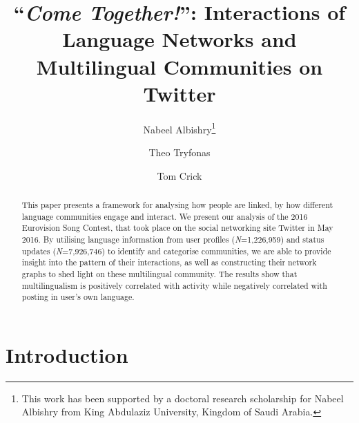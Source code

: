 \documentclass{llncs}
\begin{document}
\title{``{\emph{Come Together!}}'': Interactions of Language Networks and Multilingual Communities on Twitter}

\author{Nabeel Albishry\thanks{This work has been supported by a doctoral research scholarship for
Nabeel Albishry from King Abdulaziz University, Kingdom of Saudi
Arabia.} \and Theo Tryfonas \and Tom
  Crick}



\maketitle

\begin{abstract}
This paper presents a framework for analysing how people are 
linked, by how different language communities engage and interact.
We present our analysis of the 2016 Eurovision Song Contest, 
that took place on the social networking site Twitter in May 2016. 
By utilising language information from user profiles
({\emph{N}}=1,226,959) and status updates ({\emph{N}}=7,926,746) to
identify and categorise communities, we are able to provide insight
into the pattern of their interactions, as well as constructing their
network graphs to shed light on these multilingual community.  
The results show that multilingualism is positively correlated with activity
while negatively correlated with posting in user's own language.
 
\end{abstract}

\section{Introduction}\label{intro}
\end{document}
